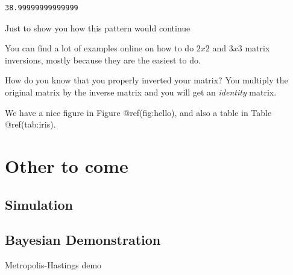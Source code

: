 \documentclass[
  letterpaper,
]{krantz}
\begin{document}
\begin{verbatim}
38.99999999999999
\end{verbatim}

Just to show you how this pattern would continue

You can find a lot of examples online on how to do \(2x2\) and \(3x3\)
matrix inversions, mostly because they are the easiest to do.

How do you know that you properly inverted your matrix? You multiply the
original matrix by the inverse matrix and you will get an
\emph{identity} matrix.

We have a nice figure in Figure @ref(fig:hello), and also a table in
Table @ref(tab:iris).

\chapter{Other to come}\label{other-to-come}

\section{Simulation}\label{simulation}

\section{Bayesian Demonstration}\label{bayesian-demonstration}

Metropolis-Hastings demo
\end{document}
